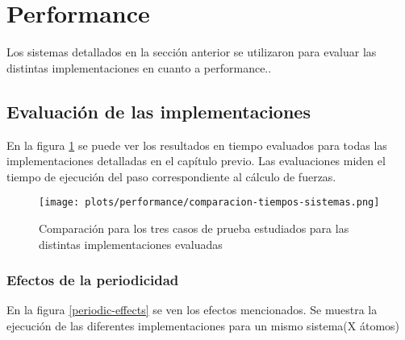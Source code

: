 \section{Performance}
Los sistemas detallados en la sección anterior se utilizaron para evaluar las distintas implementaciones en cuanto a performance..

\subsection{Evaluación de las implementaciones}


En la figura \ref{time-compare} se puede ver los resultados en tiempo evaluados para todas las implementaciones detalladas en el capítulo previo.
Las evaluaciones miden el tiempo de ejecución del paso correspondiente al cálculo de fuerzas.



\begin{figure}[htbp]
\centering
   \texttt{[image: plots/performance/comparacion-tiempos-sistemas.png]}
 \caption{Comparaci\'on para los tres casos de prueba estudiados para las distintas implementaciones evaluadas}
 \label{time-compare}
\end{figure}


\subsubsection{Efectos de la periodicidad}


En la figura \ref{periodic-effects} se ven los efectos mencionados. Se muestra la ejecución de las diferentes implementaciones para un mismo sistema(X átomos) 

